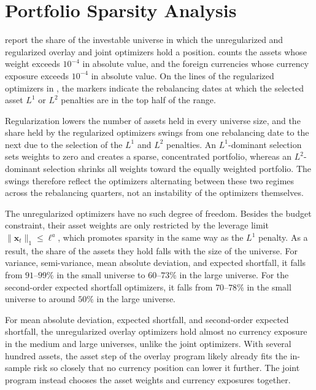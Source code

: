 \newpage
\null
\newpage

\section{Portfolio Sparsity Analysis} \label{app:portfolio-sparsity}

 report the share of
the investable universe in which the unregularized and regularized overlay and joint optimizers hold a position.
 counts the assets whose weight exceeds $10^{-4}$ in absolute value, and
 the foreign currencies whose currency exposure exceeds $10^{-4}$ in absolute value. On the lines of the regularized
optimizers in , the markers indicate the rebalancing dates at which the selected asset $L^1$ or
$L^2$ penalties are in the top half of the range.

Regularization lowers the number of assets held in every universe size, and the share held by the regularized optimizers
swings from one rebalancing date to the next due to the selection of the $L^1$ and $L^2$ penalties.
An $L^1$-dominant selection sets weights
to zero and creates a sparse, concentrated portfolio, whereas an $L^2$-dominant selection shrinks all weights toward the equally
weighted portfolio. The swings therefore reflect the optimizers alternating between these two regimes across
the rebalancing quarters, not an instability of the optimizers themselves.

The unregularized optimizers have no such degree of freedom. Besides the budget constraint, their asset weights are only
restricted by the leverage limit $\|\bm{x}_t\|_1 \le \ell^a$, which promotes sparsity in the same way as the $L^1$ penalty. 
As a result, the share of the assets they hold falls with the size of the universe. For variance,
semi-variance, mean absolute deviation, and expected shortfall, it falls from $91$--$99\%$ in the small universe to $60$--$73\%$
in the large universe. For the second-order expected shortfall optimizers, it falls from $70$--$78\%$ in 
the small universe to around $50\%$ in the large universe.

For mean absolute deviation, expected shortfall, and second-order expected shortfall, the unregularized overlay optimizers hold almost no
currency exposure in the medium and large universes, unlike the joint optimizers. With several hundred
assets, the asset step of the overlay program likely already fits the in-sample risk so closely that no currency position can
lower it further. The joint program instead chooses the asset weights and currency exposures together.


